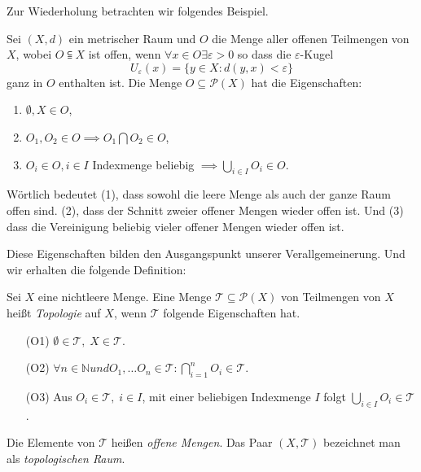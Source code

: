 Zur Wiederholung betrachten wir folgendes Beispiel. 

{
    Sei $(X,d)$ ein metrischer Raum und $O$ die Menge aller offenen Teilmengen von $X$,
    wobei $O \subseteqq X$ ist offen, wenn $\forall x \in O \exists \varepsilon > 0$ so dass die $\varepsilon$-Kugel
    $$
        U_\varepsilon(x) = \{ y \in X : d(y,x) < \varepsilon \}
    $$
    ganz in $O$ enthalten ist. 
    Die Menge $O \subseteq \mathcal{P}(X)$ hat die Eigenschaften:
    \begin{enumerate}
        \item $\emptyset, X \in O$,
        \item $O_1, O_2 \in O \implies O_1 \bigcap O_2 \in O$,
        \item $O_i \in O, i \in I$ Indexmenge beliebig $\implies \bigcup_{i \in I} O_i \in O$.
    \end{enumerate}
    Wörtlich bedeutet (1), dass sowohl die leere Menge als auch der ganze Raum
    offen sind. (2), dass der Schnitt zweier offener Mengen wieder offen ist.
    Und (3) dass die Vereinigung beliebig vieler offener Mengen wieder offen ist.
}

Diese Eigenschaften bilden den Ausgangspunkt unserer Verallgemeinerung. Und wir erhalten die folgende Definition:


{
    Sei $X$ eine nichtleere Menge. Eine Menge $\mathcal{T} \subseteq \mathcal{P}(X)$ von Teilmengen 
von $X$ heißt \emph{Topologie} auf $X$, wenn $\mathcal{T}$ folgende Eigenschaften hat.
\begin{itemize}
    \item[(O1)] $\emptyset \in \mathcal{T}, \; X \in \mathcal{T}$.
    \item[(O2)] $\forall n \in \mathbb{N} und O_1, \dots O_n \in \mathcal{T} : 
     \bigcap_{i=1}^{n} O_i \in \mathcal{T}$.
    \item[(O3)] Aus $O_i \in \mathcal{T}, \; i \in I$, mit einer beliebigen Indexmenge $I$ folgt 
    $\bigcup_{i \in I} O_i \in \mathcal{T}$.
\end{itemize}
Die Elemente von $\mathcal{T}$ heißen \emph{offene Mengen}. Das Paar $(X, \mathcal{T})$ 
bezeichnet man als \emph{topologischen Raum}.
}

